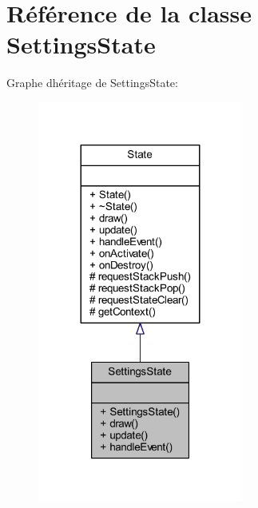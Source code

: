 \hypertarget{class_settings_state}{}\section{Référence de la classe Settings\+State}
\label{class_settings_state}


Graphe d\textquotesingle{}héritage de Settings\+State\+:\nopagebreak
\begin{figure}[H]
\begin{center}
\leavevmode
\includegraphics[width=191pt]{class_settings_state__inherit__graph}
\end{center}
\end{figure}


